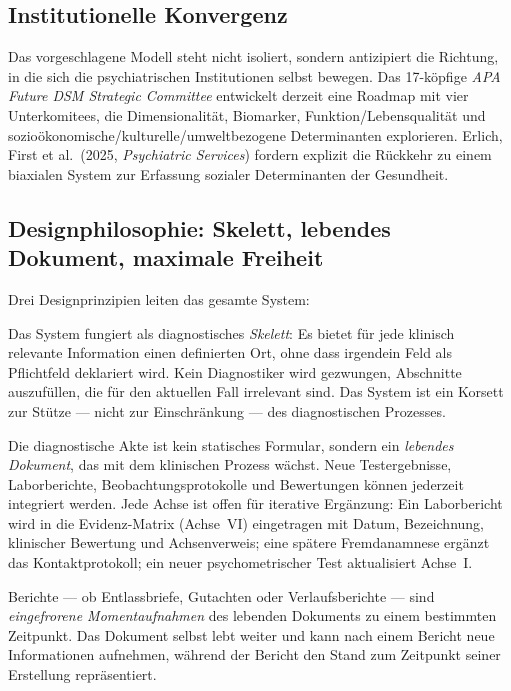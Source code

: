 \documentclass[11pt,a4paper]{article}
\begin{document}
\subsection{Institutionelle Konvergenz}

Das vorgeschlagene Modell steht nicht isoliert, sondern antizipiert die Richtung, in die sich die psychiatrischen Institutionen selbst bewegen. Das 17-k\"opfige \textit{APA Future DSM Strategic Committee} entwickelt derzeit eine \glqq Roadmap\grqq{} mit vier Unterkomitees, die Dimensionalit\"at, Biomarker, Funktion/Lebensqualit\"at und sozio\"okonomische/kulturelle/umweltbezogene Determinanten explorieren. Erlich, First et al.\ (2025, \textit{Psychiatric Services}) fordern explizit die R\"uckkehr zu einem biaxialen System zur Erfassung sozialer Determinanten der Gesundheit.


\subsection{Designphilosophie: Skelett, lebendes Dokument, maximale Freiheit}
\label{sec:designphilosophie}

Drei Designprinzipien leiten das gesamte System:

\begin{description}[style=nextline, leftmargin=1.5cm, font=\bfseries]
\item[Skelett-Prinzip] Das System fungiert als diagnostisches \textit{Skelett}: Es bietet f\"ur jede klinisch relevante Information einen definierten Ort, ohne dass irgendein Feld als Pflichtfeld deklariert wird. Kein Diagnostiker wird gezwungen, Abschnitte auszuf\"ullen, die f\"ur den aktuellen Fall irrelevant sind. Das System ist ein Korsett zur St\"utze --- nicht zur Einschr\"ankung --- des diagnostischen Prozesses.
\item[Lebendes Dokument] Die diagnostische Akte ist kein statisches Formular, sondern ein \textit{lebendes Dokument}, das mit dem klinischen Prozess w\"achst. Neue Testergebnisse, Laborberichte, Beobachtungsprotokolle und Bewertungen k\"onnen jederzeit integriert werden. Jede Achse ist offen f\"ur iterative Erg\"anzung: Ein Laborbericht wird in die Evidenz-Matrix (Achse~VI) eingetragen mit Datum, Bezeichnung, klinischer Bewertung und Achsenverweis; eine sp\"atere Fremdanamnese erg\"anzt das Kontaktprotokoll; ein neuer psychometrischer Test aktualisiert Achse~I.
\item[Bericht als Snapshot] Berichte --- ob Entlassbriefe, Gutachten oder Verlaufsberichte --- sind \textit{eingefrorene Momentaufnahmen} des lebenden Dokuments zu einem bestimmten Zeitpunkt. Das Dokument selbst lebt weiter und kann nach einem Bericht neue Informationen aufnehmen, w\"ahrend der Bericht den Stand zum Zeitpunkt seiner Erstellung repr\"asentiert.
\end{description}
\end{document}
